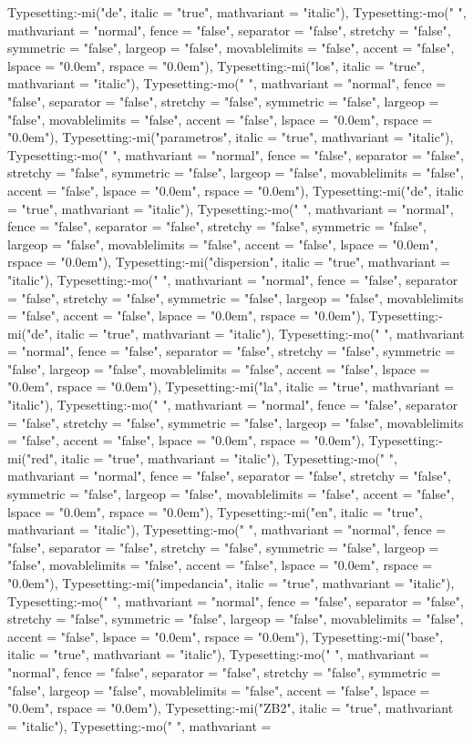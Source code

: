 \documentclass{article}
\begin{document}
\begin{Maple Normal}
{\begin{Maple Normal}
{Typesetting:-mi("de", italic = "true", mathvariant = "italic"), Typesetting:-mo(" ", mathvariant = "normal", fence = "false", separator = "false", stretchy = "false", symmetric = "false", largeop = "false", movablelimits = "false", accent = "false", lspace = "0.0em", rspace = "0.0em"), Typesetting:-mi("los", italic = "true", mathvariant = "italic"), Typesetting:-mo(" ", mathvariant = "normal", fence = "false", separator = "false", stretchy = "false", symmetric = "false", largeop = "false", movablelimits = "false", accent = "false", lspace = "0.0em", rspace = "0.0em"), Typesetting:-mi("parametros", italic = "true", mathvariant = "italic"), Typesetting:-mo(" ", mathvariant = "normal", fence = "false", separator = "false", stretchy = "false", symmetric = "false", largeop = "false", movablelimits = "false", accent = "false", lspace = "0.0em", rspace = "0.0em"), Typesetting:-mi("de", italic = "true", mathvariant = "italic"), Typesetting:-mo(" ", mathvariant = "normal", fence = "false", separator = "false", stretchy = "false", symmetric = "false", largeop = "false", movablelimits = "false", accent = "false", lspace = "0.0em", rspace = "0.0em"), Typesetting:-mi("dispersion", italic = "true", mathvariant = "italic"), Typesetting:-mo(" ", mathvariant = "normal", fence = "false", separator = "false", stretchy = "false", symmetric = "false", largeop = "false", movablelimits = "false", accent = "false", lspace = "0.0em", rspace = "0.0em"), Typesetting:-mi("de", italic = "true", mathvariant = "italic"), Typesetting:-mo(" ", mathvariant = "normal", fence = "false", separator = "false", stretchy = "false", symmetric = "false", largeop = "false", movablelimits = "false", accent = "false", lspace = "0.0em", rspace = "0.0em"), Typesetting:-mi("la", italic = "true", mathvariant = "italic"), Typesetting:-mo(" ", mathvariant = "normal", fence = "false", separator = "false", stretchy = "false", symmetric = "false", largeop = "false", movablelimits = "false", accent = "false", lspace = "0.0em", rspace = "0.0em"), Typesetting:-mi("red", italic = "true", mathvariant = "italic"), Typesetting:-mo(" ", mathvariant = "normal", fence = "false", separator = "false", stretchy = "false", symmetric = "false", largeop = "false", movablelimits = "false", accent = "false", lspace = "0.0em", rspace = "0.0em"), Typesetting:-mi("en", italic = "true", mathvariant = "italic"), Typesetting:-mo(" ", mathvariant = "normal", fence = "false", separator = "false", stretchy = "false", symmetric = "false", largeop = "false", movablelimits = "false", accent = "false", lspace = "0.0em", rspace = "0.0em"), Typesetting:-mi("impedancia", italic = "true", mathvariant = "italic"), Typesetting:-mo(" ", mathvariant = "normal", fence = "false", separator = "false", stretchy = "false", symmetric = "false", largeop = "false", movablelimits = "false", accent = "false", lspace = "0.0em", rspace = "0.0em"), Typesetting:-mi("base", italic = "true", mathvariant = "italic"), Typesetting:-mo(" ", mathvariant = "normal", fence = "false", separator = "false", stretchy = "false", symmetric = "false", largeop = "false", movablelimits = "false", accent = "false", lspace = "0.0em", rspace = "0.0em"), Typesetting:-mi("ZB2", italic = "true", mathvariant = "italic"), Typesetting:-mo(" ", mathvariant = }
\end{Maple Normal}}
\end{Maple Normal}
\end{document}
